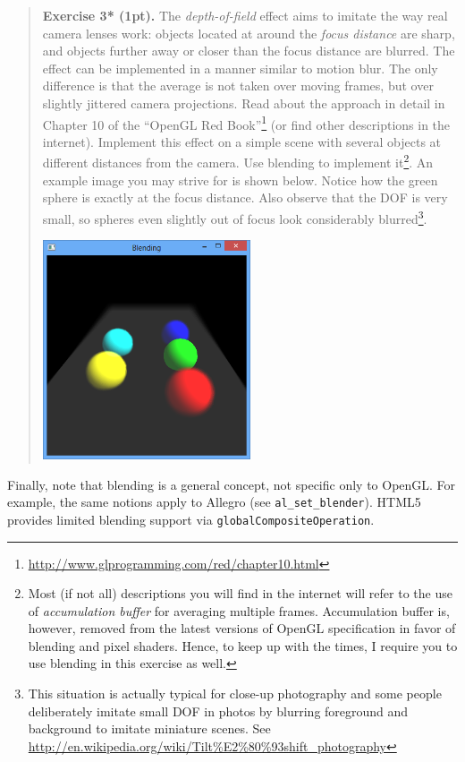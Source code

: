 \documentclass{article}
\newenvironment{exercise}[2]{\begin{verse}\textbf{Exercise #1 (#2pt).} }{
\end{verse}\medskip}
\begin{document}
\begin{exercise}{3*}{1}
The \emph{depth-of-field} effect aims to imitate the way real camera lenses work: objects located at around the \emph{focus distance} are sharp, and objects further away or closer than the focus distance are blurred. The effect can be implemented in a manner similar to motion blur. The only difference is that the average is not taken over moving frames, but over slightly jittered camera projections. Read about the approach in detail in Chapter 10 of the ``OpenGL Red Book''\footnote{\url{http://www.glprogramming.com/red/chapter10.html}} (or find other descriptions in the internet). Implement this effect on a simple scene with several objects at different distances from the camera. Use blending to implement it\footnote{Most (if not all) descriptions you will find in the internet will refer to the use of \emph{accumulation buffer} for averaging multiple frames. Accumulation buffer is, however, removed from the latest versions of OpenGL specification in favor of blending and pixel shaders. Hence, to keep up with the times, I require you to use blending in this exercise as well.}. An example image you may strive for is shown below. Notice how the green sphere is exactly at the focus distance. Also observe that the DOF is very small, so spheres even slightly out of focus look considerably blurred\footnote{This situation is actually typical for close-up photography and some people deliberately imitate small DOF in photos by blurring foreground and background to imitate miniature scenes. See \url{http://en.wikipedia.org/wiki/Tilt\%E2\%80\%93shift_photography}}.
\begin{center}
\includegraphics[width=0.5\textwidth]{dof.png}
\end{center}
\end{exercise}

Finally, note that blending is a general concept, not specific only to OpenGL. For example, the same notions apply to Allegro (see \verb#al_set_blender#). HTML5 provides limited blending support via \verb#globalCompositeOperation#.
\end{document}
